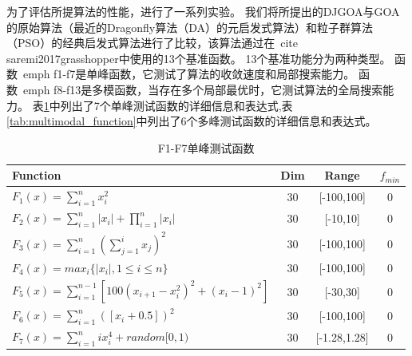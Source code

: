 为了评估所提算法的性能，进行了一系列实验。 我们将所提出的DJGOA与GOA的原始算法（最近的Dragonfly算法（DA）的元启发式算法）和粒子群算法（PSO）的经典启发式算法进行了比较，该算法通过在\ cite {saremi2017grasshopper}中使用的13个基准函数。 13个基准功能分为两种类型。 函数\ emph {f1-f7}是单峰函数，它测试了算法的收敛速度和局部搜索能力。 函数\ emph {f8-f13}是多模函数，当存在多个局部最优时，它测试算法的全局搜索能力。 表\ref{tab:unimodal_function}中列出了7个单峰测试函数的详细信息和表达式,表\ref{tab:multimodal_function}中列出了6个多峰测试函数的详细信息和表达式。
\begin{table}[!htbp]
    \centering
    \caption{F1-F7单峰测试函数}
    \label{tab:unimodal_function}
    \renewcommand\arraystretch{1.5} 
\begin{tabular}{l c c c}
  \hline
  Function & Dim & Range & $f_{min}$ \\
  \hline
  $F_1(x)=\sum_{i=1}^n x_i^2$ & 30 & [-100,100]&0 \\
  \hline
  $F_2(x)=\sum_{i=1}^n\left|x_i\right|+\prod_{i=1}^n\left|x_i\right|$& 30 & [-10,10]&0 \\
  \hline
  $F_3(x)=\sum_{i=1}^n(\sum_{j=1}^ix_j)^2$& 30 & [-100,100] & 0\\
  \hline
  $F_4(x)=max_i\{\left|x_i\right|,1\leq i\leq n\}$& 30 & [-100,100] & 0\\
  \hline
  $F_5(x)=\sum_{i=1}^{n-1}[100(x_{i+1}-x_i^2)^2+(x_i-1)^2]$& 30 & [-30,30] & 0\\
  \hline
  $F_6(x)=\sum_{i=1}^n([x_i+0.5])^2$& 30 & [-100,100] & 0\\
  \hline
  $F_7(x)=\sum_{i=1}^n ix_i^4 + random[0,1)$& 30 & [-1.28,1.28] & 0\\
  \hline
\end{tabular}
\end{table}


